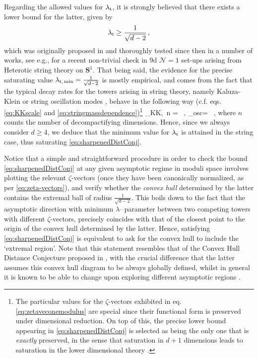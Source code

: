 Regarding the allowed values for $\lambda_{\rm t}$, it is strongly believed that there exists a lower bound for the latter, given by 
%
\begin{equation}\label{eq:sharpenedDistConj}
  \lambda_{\rm t} \geq \frac{1}{\sqrt{d-2}}\, ,
\end{equation}
%
which was originally proposed in \cite{Etheredge:2022opl} and thoroughly tested since then in a number of works, see e.g., \cite{Etheredge:2023odp} for a recent non-trivial check in 9d $\mathcal{N}=1$ set-ups arising from Heterotic string theory on $\mathbf{S}^1$. That being said, the evidence for the precise saturating value $\lambda_{\rm t,\, min} = \frac{1}{\sqrt{d-2}}$ is mostly empirical, and comes from the fact that the typical decay rates for the towers arising in string theory, namely Kaluza-Klein or string oscillation modes \cite{Lee:2019wij}, behave in the following way (c.f. eqs. \eqref{eq:KKscale} and \eqref{eq:stringmassdependence})\footnote{\label{fnote:exactpreservation}The particular values for the $\zeta$-vectors exhibited in eq. \eqref{eq:zetaveconemodulus} are special since their functional form is preserved under dimensional reduction. On top of this, the precise lower bound appearing in \eqref{eq:sharpenedDistConj} is selected as being the only one that is \emph{exactly} preserved, in the sense that saturation in $d+1$ dimensions leads to saturation in the lower dimensional theory \cite{Calderon-Infante:2023ler}.}
%
\beq\label{eq:zetaveconemodulus}
	\zeta_{{\rm KK},\, n} = \, , \qquad \zeta_{\rm osc}= \, ,
\eeq
%
where $n$ counts the number of decompactifying dimensions. Hence, since we always consider $d\geq 4$, we deduce that the minimum value for $\lambda_{\rm t}$ is attained in the string case, thus saturating \eqref{eq:sharpenedDistConj}.

Notice that a simple and straightforward procedure in order to check the bound \eqref{eq:sharpenedDistConj} at any given asymptotic regime in moduli space involves plotting the relevant $\zeta$-vectors (once they have been canonically normalized, as per \eqref{eq:zeta-vectors}), and verify whether the \emph{convex hull} determined by the latter contains the extremal ball of radius $\frac{1}{\sqrt{d-2}}$. This boils down to the fact that the asymptotic direction with minimum $\lambda$--\,parameter between two competing towers with different $\zeta$-vectors, precisely coincides with that of the closest point to the origin of the convex hull determined by the latter. Hence, satisfying \eqref{eq:sharpenedDistConj} is equivalent to ask for the convex hull to include the `extremal region'. Note that this statement resembles that of the Convex Hull Distance Conjecture proposed in \cite{Calderon-Infante:2020dhm}, with the crucial difference that the latter assumes this convex hull diagram to be always globally defined, whilst in general it is known to be able to change upon exploring different asymptotic regions \cite{Etheredge:2023odp}.

